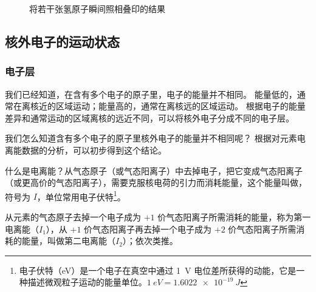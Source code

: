 \begin{figure}
  \begin{minipage}{0.24\linewidth}\centering
    \label{fig:5-2a}
  \end{minipage}
  \begin{minipage}{0.24\linewidth}\centering
    \label{fig:5-2b}
  \end{minipage}
  \begin{minipage}{0.24\linewidth}\centering
    \label{fig:5-2c}
  \end{minipage}
  \begin{minipage}{0.24\linewidth}\centering
    \label{fig:5-2d}
  \end{minipage}
  \caption{将若干张氢原子瞬间照相叠印的结果}\label{fig:5-2}
\end{figure}

\subsection{核外电子的运动状态}
\subsubsection{电子层}
我们已经知道，在含有多个电子的原子里，电子的能量并不相同。
能量低的，通常在离核近的区域运动；能量高的，通常在离核远的区域运动。
根据电子的能量差异和通常运动的区域离核的远近不同，可以将核外电子分成不同的电子层。

我们怎么知道含有多个电子的原子里核外电子的能量并不相同呢？
根据对元素电离能数据的分析，可以初步得到这个结论。

什么是电离能？从气态原子（或气态阳离子）中去掉电子，把它变成气态阳离子（或更高价的气态阳离子），需要克服核电荷的引力而消耗能量，这个能量叫做，符号为 $I$，单位常用电子伏特\footnote{电子伏特（\unit{eV}）是一个电子在真空中通过 \qty{1}{V} 电位差所获得的动能，它是一种描述微观粒子运动的能量单位。$\qty{1}{eV}=\qty{1.6022e-19}{J}$}。

从元素的气态原子去掉一个电子成为 $+1$ 价气态阳离子所需消耗的能量，称为第一电离能（$I_1$），从 $+1$ 价气态阳离子再去掉一个电子成为 $+2$ 价气态阳离子所需消耗的能量，叫做第二电离能（$I_2$）；依次类推。


